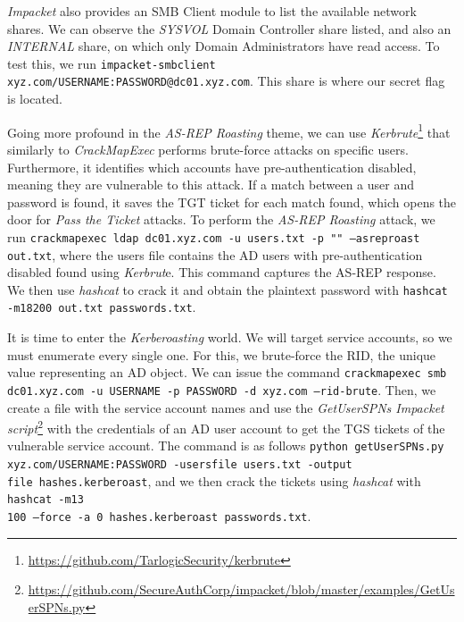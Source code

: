 \textit{Impacket} also provides an SMB Client module to list the available network shares. We can observe the \textit{SYSVOL} Domain Controller share listed, and also an \textit{INTERNAL} share, on which only Domain Administrators have read access. To test this, we run \texttt{impacket-smbclient xyz.com/USERNAME:PASSWORD@dc01.xyz.com}. This share is where our secret flag is located. 

Going more profound in the \textit{AS-REP Roasting} theme, we can use \textit{Kerbrute}\footnote{\url{https://github.com/TarlogicSecurity/kerbrute}} that similarly to \textit{CrackMapExec} performs brute-force attacks on specific users. Furthermore, it identifies which accounts have pre-authentication disabled, meaning they are vulnerable to this attack. If a match between a user and password is found, it saves the TGT ticket for each match found, which opens the door for \textit{Pass the Ticket} attacks. To perform the \textit{AS-REP Roasting} attack, we run \texttt{crackmapexec ldap dc01.xyz.com -u users.txt -p "" ---asreproast out.txt}, where the users file contains the AD users with pre-authentication disabled found using \textit{Kerbrut}e. This command captures the AS-REP response. We then use \textit{hashcat} to crack it and obtain the plaintext password with \texttt{hashcat -m18200 out.txt passwords.txt}. 

It is time to enter the \textit{Kerberoasting} world. We will target service accounts, so we must enumerate every single one. For this, we brute-force the RID, the unique value representing an AD object. We can issue the command \texttt{crackmapexec smb dc01.xyz.com -u USERNAME -p PASSWORD -d xyz.com ---rid-brute}. Then, we create a file with the service account names and use the \textit{GetUserSPNs Impacket script}\footnote{\url{https://github.com/SecureAuthCorp/impacket/blob/master/examples/GetUserSPNs.py}} with the credentials of an AD user account to get the TGS tickets of the vulnerable service account. The command is as follows \texttt{python getUserSPNs.py xyz.com/USERNAME:PASSWORD -usersfile users.txt -output\\file hashes.kerberoast}, and we then crack the tickets using \textit{hashcat} with \texttt{hashcat -m13\\100 ---force -a 0 hashes.kerberoast passwords.txt}.

